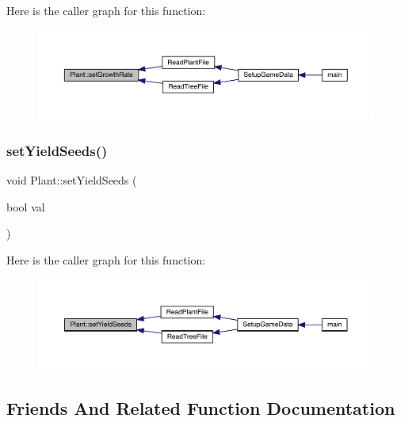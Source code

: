 Here is the caller graph for this function\+:
\nopagebreak
\begin{figure}[H]
\begin{center}
\leavevmode
\includegraphics[width=350pt]{d7/d0b/class_plant_af55fc2a9b7b3833ecc305f7fe19fd5dd_icgraph}
\end{center}
\end{figure}
\mbox{\label{class_plant_a21c26df7238a78906804603559f5cc04}} 
\subsubsection{\texorpdfstring{set\+Yield\+Seeds()}{setYieldSeeds()}}
{\footnotesize\ttfamily void Plant\+::set\+Yield\+Seeds (\begin{DoxyParamCaption}\item[{bool}]{val }\end{DoxyParamCaption})}

Here is the caller graph for this function\+:
\nopagebreak
\begin{figure}[H]
\begin{center}
\leavevmode
\includegraphics[width=350pt]{d7/d0b/class_plant_a21c26df7238a78906804603559f5cc04_icgraph}
\end{center}
\end{figure}


\subsection{Friends And Related Function Documentation}
\mbox{\label{class_plant_a4b682814d14447120dd184fd300deade}} 
